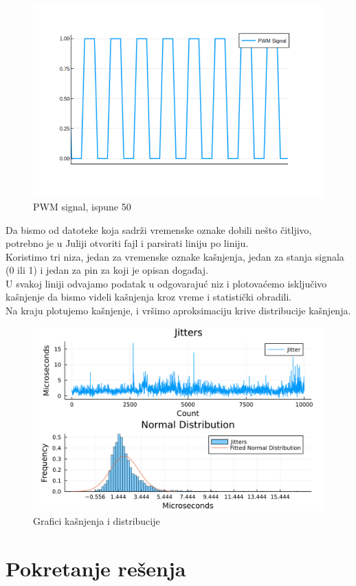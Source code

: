 \documentclass[a4paper, 11pt, titlepage]{article}
\begin{document}
\begin{figure}[h]
    \centering
    \includegraphics[width=0.50\linewidth]{PWM.png}
    \caption{PWM signal, ispune 50}
    
\end{figure}


Da bismo od datoteke koja sadrži vremenske oznake dobili nešto čitljivo, potrebno je u Juliji otvoriti fajl i parsirati liniju po liniju. \\

Koristimo tri niza, jedan za vremenske oznake kašnjenja, jedan za stanja signala (0 ili 1) i jedan za pin za koji je opisan događaj. \\

U svakoj liniji odvajamo podatak u odgovarajuć niz i plotovaćemo isključivo kašnjenje da bismo videli kašnjenja kroz vreme i statistički obradili.\\

Na kraju plotujemo kašnjenje, i vršimo aproksimaciju krive distribucije kašnjenja. \\
\begin{figure}
    \centering
    \includegraphics[width=1\linewidth]{dvagrafika.png}
    \caption{Grafici kašnjenja i distribucije}
\end{figure}
\newpage
\section{Pokretanje rešenja}
\end{document}
